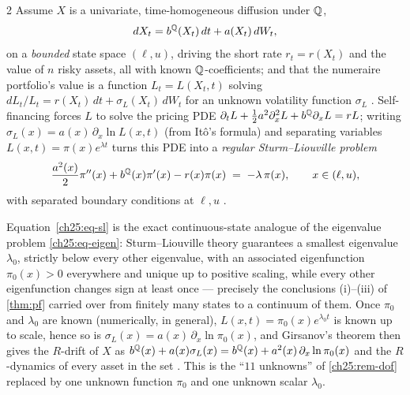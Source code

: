 \begin{paracol}{2}
Assume $X$ is a univariate, time-homogeneous diffusion under $\mathbb{Q}$,
\[
  dX_t = b^{\mathbb{Q}}(X_t)\,dt + a(X_t)\,dW_t,
\]
on a \emph{bounded} state space $(\ell,u)$, driving the short rate $r_t=r(X_t)$ and the value of $n$ risky
assets, all with known $\mathbb{Q}$-coefficients; and that the numeraire portfolio's value is a function
$L_t=L(X_t,t)$ solving $dL_t/L_t=r(X_t)\,dt+\sigma_L(X_t)\,dW_t$ for an unknown volatility function
$\sigma_L$ . Self-financing forces $L$ to solve the pricing PDE
$\partial_tL+\tfrac12a^2\partial_x^2L+b^{\mathbb{Q}}\partial_xL=rL$; writing $\sigma_L(x)=a(x)\,\partial_x\ln L(x,t)$
(from It\^o's formula) and separating variables $L(x,t)=\pi(x)e^{\lambda t}$ turns this PDE into a
\emph{regular Sturm--Liouville problem}
\begin{equation}\label{ch25:eq-sl}
  \frac{a^2(x)}{2}\pi''(x) + b^{\mathbb{Q}}(x)\pi'(x) - r(x)\pi(x) \;=\; -\lambda\,\pi(x), \qquad x\in(\ell,u),
\end{equation}
with separated boundary conditions at $\ell,u$ .

\begin{finance}
Equation~\eqref{ch25:eq-sl} is the exact continuous-state analogue of the eigenvalue problem
\eqref{ch25:eq-eigen}: Sturm--Liouville theory guarantees a smallest eigenvalue $\lambda_0$, strictly below
every other eigenvalue, with an associated eigenfunction $\pi_0(x)>0$ everywhere and unique up to positive
scaling, while every other eigenfunction changes sign at least once  --- precisely the
conclusions (i)--(iii) of \cref{thm:pf} carried over from finitely many states to a continuum of them. Once
$\pi_0$ and $\lambda_0$ are known (numerically, in general), $L(x,t)=\pi_0(x)e^{\lambda_0t}$ is known up to
scale, hence so is $\sigma_L(x)=a(x)\,\partial_x\ln\pi_0(x)$, and Girsanov's theorem then gives the $R$-drift
of $X$ as $b^{\mathbb{Q}}(x)+a(x)\sigma_L(x)=b^{\mathbb{Q}}(x)+a^2(x)\,\partial_x\ln\pi_0(x)$ and the $R$-dynamics of every asset in the set .
This is the ``$11$ unknowns'' of \cref{ch25:rem-dof} replaced by one unknown function $\pi_0$ and one
unknown scalar $\lambda_0$.
\end{finance}


\end{paracol}
